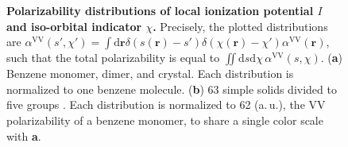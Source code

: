 \begin{figure}[t!]
\caption{\textbf{Polarizability distributions of local ionization potential $I$ and iso-orbital indicator $\chi$.}
Precisely, the plotted distributions are $\alpha^\text{VV}(s',\chi')=\int\mathrm d\mathbf r\delta(s(\mathbf r)-s')\delta(\chi(\mathbf r)-\chi')\alpha^\text{VV}(\mathbf r)$, such that the total polarizability is equal to $\iint\mathrm ds\mathrm d\chi\,\alpha^\text{VV}(s,\chi)$.
(\textbf a) Benzene monomer, dimer, and crystal.
Each distribution is normalized to one benzene molecule.
(\textbf b) 63 simple solids divided to five groups \citep{ZhangNJP18}.
Each distribution is normalized to 62 (a.\,u.), the VV polarizability of a benzene monomer, to share a single color scale with \textbf{a}.
}\label{fig:pol-hists}
\end{figure}

